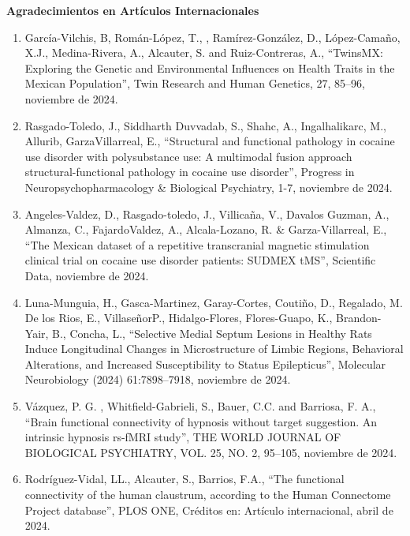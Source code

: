 \textbf{Agradecimientos en Artículos Internacionales}

\hfill

\begin{enumerate}

\item García-Vilchis, B, Román-López, T., , Ramírez-González, D., López-Camaño, X.J., Medina-Rivera, A., Alcauter, S. and 
Ruiz-Contreras, A., “TwinsMX: Exploring the Genetic and Environmental Influences on Health Traits in the Mexican 
Population”, Twin Research and Human Genetics, 27, 85–96, noviembre de 2024.

\item Rasgado-Toledo, J., Siddharth Duvvadab, S., Shahc, A., Ingalhalikarc, M., Allurib, GarzaVillarreal, E., “Structural 
and 
functional pathology in cocaine use disorder with polysubstance use: A multimodal fusion approach structural-functional 
pathology in cocaine use disorder”, Progress in Neuropsychopharmacology \& Biological Psychiatry, 1-7, noviembre de 2024.

\item Angeles-Valdez, D., Rasgado-toledo, J., Villicaña, V., Davalos Guzman, A., Almanza, C., FajardoValdez, A., 
Alcala-Lozano, R. \& Garza-Villarreal, E., “The Mexican dataset of a repetitive transcranial magnetic stimulation clinical 
trial on cocaine use disorder patients: SUDMEX tMS”, Scientific Data, noviembre de 
2024.

\item Luna-Munguia, H., Gasca-Martinez, Garay-Cortes, Coutiño, D., Regalado, M. De los Rios, E., VillaseñorP., 
Hidalgo-Flores, 
Flores-Guapo, K., Brandon-Yair, B., Concha, L., “Selective Medial Septum Lesions in Healthy Rats Induce Longitudinal 
Changes in Microstructure of Limbic Regions, Behavioral Alterations, and Increased Susceptibility to Status Epilepticus”, 
Molecular Neurobiology (2024) 61:7898–7918, noviembre de 2024.

\item Vázquez, P. G. , Whitfield-Gabrieli, S., Bauer, C.C. and Barriosa, F. A., “Brain functional connectivity of hypnosis 
without target suggestion. An intrinsic hypnosis rs-fMRI study”, THE WORLD JOURNAL OF BIOLOGICAL PSYCHIATRY, VOL. 25, NO. 
2, 95–105, noviembre de 2024.

\item Rodríguez-Vidal, LL., Alcauter, S., Barrios, F.A., “The functional connectivity of the human claustrum, according to 
the 
Human Connectome Project database”, PLOS ONE, Créditos en: Artículo internacional, abril de 2024.


\end{enumerate}
